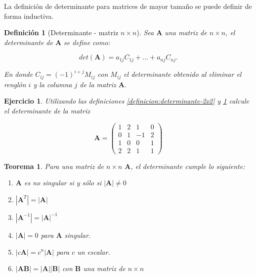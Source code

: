 \documentclass[11pt]{report}
\theoremstyle{break}
\newtheorem{definicion}{Definición}[chapter]
\newtheorem{teorema}{Teorema}[chapter]
\newtheorem{ejercicio}{Ejercicio}[chapter]
\theoremstyle{break}
\newcommand{\matdim}[2]{$#1 \times #2$}
\begin{document}
La definición de determinante para matrices de mayor tamaño se puede definir de forma inductiva.

\begin{definicion}[Determinante - matriz \matdim{n}{n}]
\label{definicion:determinante-nxn}
Sea $\bm{A}$ una matriz de \matdim{n}{n}, el determinante de $\bm{A}$ se define como:

$$ det(\bm{A}) = a_{1j}C_{1j} + \ldots + a_{nj}C_{nj}.$$

En donde $C_{ij} = (-1)^{i + j}M_{ij}$ con $M_{ij}$ el determinante obtenido al eliminar el renglón $i$ y la columna $j$ de la matriz $\bm{A}$.
\end{definicion}

\begin{ejercicio}
Utilizando las definiciones \ref{definicion:determinante-2x2} y  \ref{definicion:determinante-nxn} calcule el determinante de la matriz

$$
\bm{A} = 
\begin{pmatrix}
1 & 2 & 1 & 0\\
0 & 1 & -1 & 2 \\
1 & 0 & 0 & 1 \\
2 & 2 & 1 & 1
\end{pmatrix}
$$
\end{ejercicio}

\begin{teorema}
Para una matriz de \matdim{n}{n} $\bm{A}$, el determinante cumple lo siguiente:

\begin{enumerate}[label=\alph*)]
\item $\bm{A}$ es  no singular si y sólo si $|\bm{A}| \neq 0$

\item $|\bm{A}^{T}| = |\bm{A}|$

\item $|\bm{A}^{-1}| = |\bm{A}|^{-1}$

\item $|\bm{A}| = 0$ para $\bm{A}$ singular.

\item $|c\bm{A}| = c^{n}|\bm{A}|$ para $c$ un escalar.

\item $|\bm{A}\bm{B}| = |\bm{A}| |\bm{B}|$ con $\bm{B}$ una matriz de \matdim{n}{n}
\end{enumerate}
\end{teorema}
\end{document}
